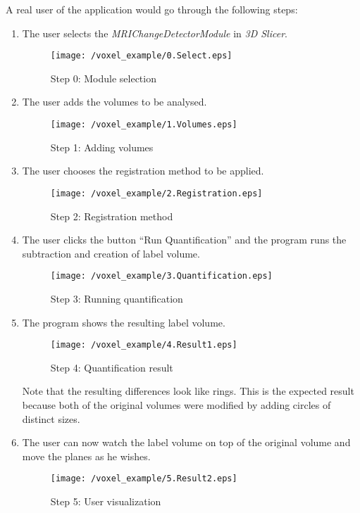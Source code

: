 A real user of the application would go through the following steps:

\begin{enumerate}
\item The user selects the \textit{MRIChangeDetectorModule} in \textit{3D Slicer}.

  \begin{figure}[H]
    \centering
    \texttt{[image: /voxel\_example/0.Select.eps]}
    \caption{Step 0: Module selection}
    \label{voxel_ex_0}
  \end{figure}
  
\item The user adds the volumes to be analysed.
  
  \begin{figure}[H]
    \centering
    \texttt{[image: /voxel\_example/1.Volumes.eps]}
    \caption{Step 1: Adding volumes}
    \label{voxel_ex_1}
  \end{figure}
  
\item The user chooses the registration method to be applied.
  
  \begin{figure}[H]
    \centering
    \texttt{[image: /voxel\_example/2.Registration.eps]}
    \caption{Step 2: Registration method}
    \label{voxel_ex_2}
  \end{figure}
  
  
\item The user clicks the button ``Run Quantification'' and the
  program runs the subtraction and creation of label volume.
  
  \begin{figure}[H]
    \centering
    \texttt{[image: /voxel\_example/3.Quantification.eps]}
    \caption{Step 3: Running quantification}
    \label{voxel_ex_3}
  \end{figure}
  
\item The program shows the resulting label volume.
  
  \begin{figure}[H]
    \centering
    \texttt{[image: /voxel\_example/4.Result1.eps]}
    \caption{Step 4: Quantification result}
    \label{voxel_ex_4}
  \end{figure}

  Note that the resulting differences look like rings. This is the
  expected result because both of the original volumes were modified
  by adding circles of distinct sizes.
  
\item The user can now watch the label volume on top of the original
  volume and move the planes as he wishes.
  
  \begin{figure}[H]
    \centering
    \texttt{[image: /voxel\_example/5.Result2.eps]}
    \caption{Step 5: User visualization}
    \label{voxel_ex_5}
  \end{figure}

\end{enumerate}



